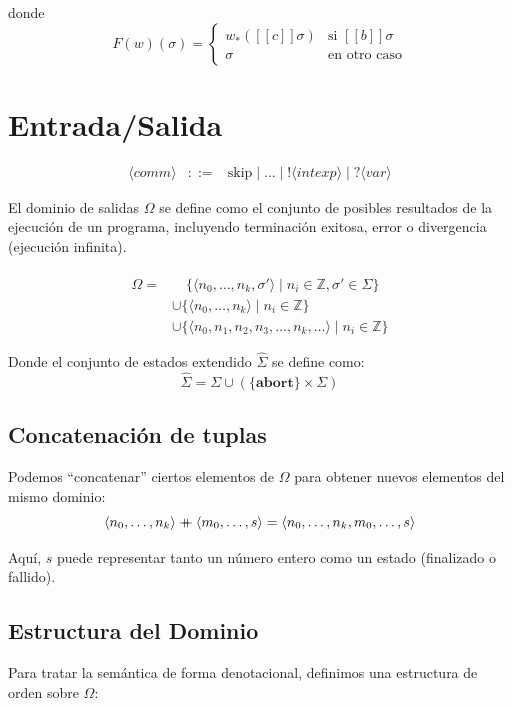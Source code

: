 \documentclass[a4paper,11pt]{article}
\begin{document}
donde
\[
F(w)(\sigma) =
\begin{cases}
w_*([[c]]\sigma) & \text{si } [[b]]\sigma \\
\sigma & \text{en otro caso}
\end{cases}
\]

\section{Entrada/Salida }
\[
\begin{array}{rcl}
\langle comm \rangle & ::= & \text{skip} \mid ... \mid ! \langle intexp \rangle \mid ? \langle var \rangle
\end{array}
\]

El dominio de salidas $\Omega$ se define como el conjunto de posibles resultados de la ejecución de un programa, incluyendo terminación exitosa, error o divergencia (ejecución infinita).

\[
\begin{aligned}
\Omega = & \quad \{\langle n_0, \dots, n_k, \sigma' \rangle \mid n_i \in \mathbb{Z}, \sigma' \in \hat{\Sigma}\} \\
& \cup \{\langle n_0, \dots, n_k \rangle \mid n_i \in \mathbb{Z}\} \\
& \cup \{\langle n_0, n_1, n_2, n_3, \dots, n_k, \dots \rangle \mid n_i \in \mathbb{Z}\}
\end{aligned}
\]

Donde el conjunto de estados extendido $\hat{\Sigma}$ se define como:
\[
\hat{\Sigma} = \Sigma \cup (\{\mathbf{abort}\} \times \Sigma)
\]

\subsection{Concatenación de tuplas}

Podemos ``concatenar'' ciertos elementos de $\Omega$ para obtener nuevos elementos del mismo dominio:
\[
\langle n_0, \dots, n_k \rangle \mathbin{+\mkern-10mu+} \langle m_0, \dots, s \rangle
= \langle n_0, \dots, n_k, m_0, \dots, s \rangle
\]

Aquí, $s$ puede representar tanto un número entero como un estado (finalizado o fallido).

\subsection{Estructura del Dominio}

Para tratar la semántica de forma denotacional, definimos una estructura de orden sobre $\Omega$:
\end{document}

